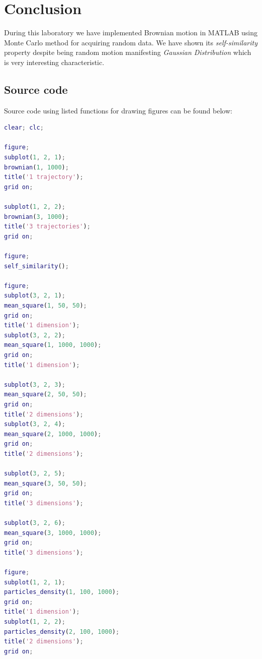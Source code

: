 \documentclass[12pt]{article}
\begin{document}
\section{Conclusion}

During this laboratory we have implemented Brownian motion in MATLAB using Monte Carlo method for acquiring random data. We have shown its \textit{self-similarity} property despite being random motion manifesting \textit{Gaussian Distribution} which is very interesting characteristic.

\subsection{Source code}

Source code using listed functions for drawing figures can be found below:

\begin{lstlisting}[language=Matlab, caption = {Source code used for drawing pictures used in this report.}]
clear; clc;

figure;
subplot(1, 2, 1);
brownian(1, 1000);
title('1 trajectory');
grid on;

subplot(1, 2, 2);
brownian(3, 1000);
title('3 trajectories');
grid on;

figure;
self_similarity();

figure;
subplot(3, 2, 1);
mean_square(1, 50, 50);
grid on;
title('1 dimension');
subplot(3, 2, 2);
mean_square(1, 1000, 1000);
grid on;
title('1 dimension');

subplot(3, 2, 3);
mean_square(2, 50, 50);
grid on;
title('2 dimensions');
subplot(3, 2, 4);
mean_square(2, 1000, 1000);
grid on;
title('2 dimensions');

subplot(3, 2, 5);
mean_square(3, 50, 50);
grid on;
title('3 dimensions');

subplot(3, 2, 6);
mean_square(3, 1000, 1000);
grid on;
title('3 dimensions');

figure;
subplot(1, 2, 1);
particles_density(1, 100, 1000);
grid on;
title('1 dimension');
subplot(1, 2, 2);
particles_density(2, 100, 1000);
title('2 dimensions');
grid on;
\end{lstlisting}
\end{document}
